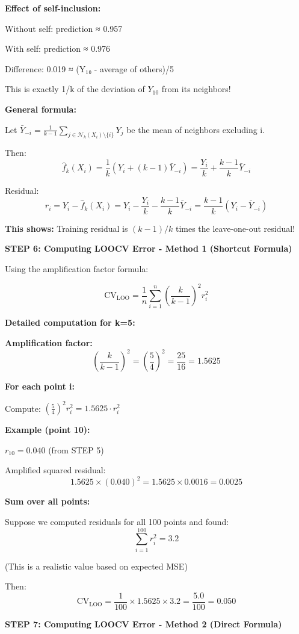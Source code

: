\documentclass[12pt]{article}
\begin{document}
\begin{solution}
\textbf{Effect of self-inclusion:}

Without self: prediction ≈ 0.957

With self: prediction ≈ 0.976

Difference: 0.019 ≈ (Y₁₀ - average of others)/5

This is exactly 1/k of the deviation of $Y_{10}$ from its neighbors!

\textbf{General formula:}

Let $\bar{Y}_{-i} = \frac{1}{k-1}\sum_{j \in \mathcal{N}_k(X_i) \setminus \{i\}} Y_j$ be the mean of neighbors excluding i.

Then:
\[
\hat{f}_k(X_i) = \frac{1}{k}\left(Y_i + (k-1)\bar{Y}_{-i}\right) = \frac{Y_i}{k} + \frac{k-1}{k}\bar{Y}_{-i}
\]

Residual:
\[
r_i = Y_i - \hat{f}_k(X_i) = Y_i - \frac{Y_i}{k} - \frac{k-1}{k}\bar{Y}_{-i} = \frac{k-1}{k}(Y_i - \bar{Y}_{-i})
\]

\textbf{This shows:} Training residual is $(k-1)/k$ times the leave-one-out residual!

\textbf{STEP 6: Computing LOOCV Error - Method 1 (Shortcut Formula)}

Using the amplification factor formula:

\[
\text{CV}_{\text{LOO}} = \frac{1}{n}\sum_{i=1}^n \left(\frac{k}{k-1}\right)^2 r_i^2
\]

\textbf{Detailed computation for k=5:}

\textbf{Amplification factor:}
\[
\left(\frac{k}{k-1}\right)^2 = \left(\frac{5}{4}\right)^2 = \frac{25}{16} = 1.5625
\]

\textbf{For each point i:}

Compute: $\left(\frac{5}{4}\right)^2 r_i^2 = 1.5625 \cdot r_i^2$

\textbf{Example (point 10):}

$r_{10} = 0.040$ (from STEP 5)

Amplified squared residual:
\[
1.5625 \times (0.040)^2 = 1.5625 \times 0.0016 = 0.0025
\]

\textbf{Sum over all points:}

Suppose we computed residuals for all 100 points and found:
\[
\sum_{i=1}^{100} r_i^2 = 3.2
\]

(This is a realistic value based on expected MSE)

Then:
\[
\text{CV}_{\text{LOO}} = \frac{1}{100} \times 1.5625 \times 3.2 = \frac{5.0}{100} = 0.050
\]

\textbf{STEP 7: Computing LOOCV Error - Method 2 (Direct Formula)}


\end{solution}
\end{document}
